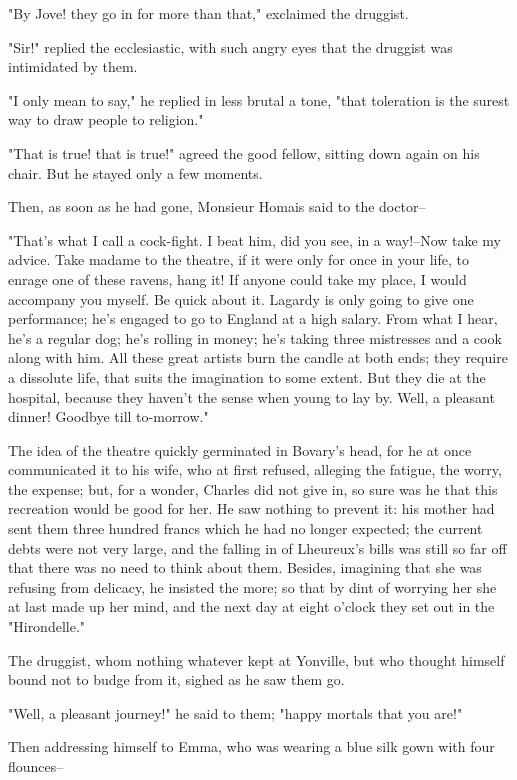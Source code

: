 \documentclass[11pt,twocolumn]{ltugboat}
\begin{document}
"By Jove! they go in for more than that," exclaimed the druggist.

"Sir!" replied the ecclesiastic, with such angry eyes that the druggist
was intimidated by them.

"I only mean to say," he replied in less brutal a tone, "that toleration
is the surest way to draw people to religion."

"That is true! that is true!" agreed the good fellow, sitting down again
on his chair. But he stayed only a few moments.

Then, as soon as he had gone, Monsieur Homais said to the doctor--

"That's what I call a cock-fight. I beat him, did you see, in a
way!--Now take my advice. Take madame to the theatre, if it were only
for once in your life, to enrage one of these ravens, hang it! If anyone
could take my place, I would accompany you myself. Be quick about it.
Lagardy is only going to give one performance; he's engaged to go to
England at a high salary. From what I hear, he's a regular dog; he's
rolling in money; he's taking three mistresses and a cook along with
him. All these great artists burn the candle at both ends; they require
a dissolute life, that suits the imagination to some extent. But they
die at the hospital, because they haven't the sense when young to lay
by. Well, a pleasant dinner! Goodbye till to-morrow."

The idea of the theatre quickly germinated in Bovary's head, for he at
once communicated it to his wife, who at first refused, alleging the
fatigue, the worry, the expense; but, for a wonder, Charles did not give
in, so sure was he that this recreation would be good for her. He saw
nothing to prevent it: his mother had sent them three hundred francs
which he had no longer expected; the current debts were not very large,
and the falling in of Lheureux's bills was still so far off that
there was no need to think about them. Besides, imagining that she
was refusing from delicacy, he insisted the more; so that by dint of
worrying her she at last made up her mind, and the next day at eight
o'clock they set out in the "Hirondelle."

The druggist, whom nothing whatever kept at Yonville, but who thought
himself bound not to budge from it, sighed as he saw them go.

"Well, a pleasant journey!" he said to them; "happy mortals that you
are!"

Then addressing himself to Emma, who was wearing a blue silk gown with
four flounces--
\end{document}
